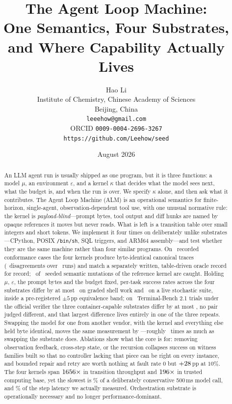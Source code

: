 \documentclass[11pt,a4paper]{article}
\title{The Agent Loop Machine:\\
       One Semantics, Four Substrates,\\
       and Where Capability Actually Lives}
\author{
  Hao Li\\
  Institute of Chemistry, Chinese Academy of Sciences\\
  Beijing, China\\
  \texttt{leeehow@gmail.com}\\
  ORCID \texttt{0009-0004-2696-3267}\\
  \texttt{https://github.com/Leehow/seed}
}
\date{August 2026}
\begin{document}
\maketitle

\begin{abstract}
An LLM agent run is usually shipped as one program, but it is three functions:
a model $\mu$, an environment $\varepsilon$, and a kernel $\kappa$ that decides
what the model sees next, what the budget is, and when the run is over.
We specify $\kappa$ alone, and then ask what it contributes.
The Agent Loop Machine (ALM) is an operational semantics for finite-horizon,
single-agent, observation-dependent tool use, with one unusual normative rule:
the kernel is \emph{payload-blind}---prompt bytes, tool output and diff hunks
are named by opaque references it moves but never reads.
What is left is a transition table over small integers and short tokens.
We implement it four times on deliberately unlike substrates---CPython, POSIX
\texttt{/bin/sh}, SQL triggers, and ARM64 assembly---and test whether they are
the same machine rather than four similar programs.
On \confcases\ recorded conformance cases the four kernels produce
byte-identical canonical traces (\confdisagree\ disagreements over \confruns\
runs) and match a separately written, table-driven oracle record for record;
\mutcaught\ of \muttotal\ seeded semantic mutations of the reference kernel
are caught.
Holding $\mu$, $\varepsilon$, the prompt bytes and the budget fixed, per-task
success rates across the four substrates differ by at most \localmaxdiff\ on
graded shell work and \submaxdiff\ on a live stochastic suite, inside a
pre-registered $\pm5$\,pp equivalence band; on \tbarmtrials\ Terminal-Bench 2.1
trials under the official verifier the three container-capable substrates
differ by at most \tbmaxdiff, no pair judged different, and that largest
difference lives entirely in one of the three repeats. Swapping the model
for one from another vendor, with the kernel and everything else held byte
identical, moves the same measurement by \modeldiff---roughly \modelratio\
times as much as swapping the substrate does.
Ablations show what the core is for: removing observation feedback,
cross-step state, or the recursion collapses success on witness families built
so that no controller lacking that piece can be right on every instance, and
bounded repair and retry are worth nothing at fault rate $0$ but
$+28$\,pp at $10\%$.
The four kernels span $1656\times$ in transition throughput and
$196\times$ in trusted computing base, yet the slowest is
\slowestshare\% of a deliberately conservative 500\,ms model call, and
\slowestshareobs\% of the step latency we actually measured.
Orchestration substrate is operationally necessary and no longer
performance-dominant.
\end{abstract}
\end{document}
